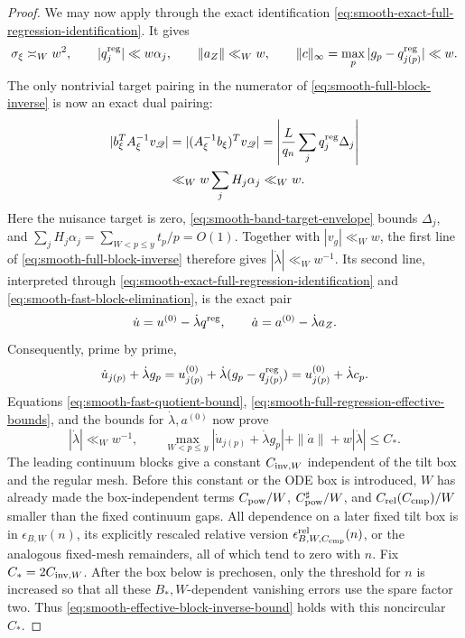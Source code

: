 \documentclass[11pt]{article}
\numberwithin{equation}{section}
\theoremstyle{definition}
\theoremstyle{remark}
\newcommand{\1}{\mathbf 1}
\begin{document}
\begin{proof}
We may now apply  through the exact
identification \eqref{eq:smooth-exact-full-regression-identification}.
It gives
\begin{equation}
 \sigma_\xi\asymp_Ww^2,\qquad
 |q_j^{\rm reg}|\ll w\alpha_j,\qquad
 \|a_Z\|\ll_Ww,\qquad
 \|c\|_\infty=\max_p|g_p-q_{j(p)}^{\rm reg}|\ll w.
 \label{eq:smooth-full-regression-effective-bounds}
\end{equation}
The only nontrivial target pairing in the numerator of
\eqref{eq:smooth-full-block-inverse} is now an exact dual pairing:
\begin{align}
 |b_\xi^TA_\xi^{-1}v_{\mathscr Q}|
 &=|(A_\xi^{-1}b_\xi)^Tv_{\mathscr Q}|
  =\left|\frac L{q_n}\sum_jq_j^{\rm reg}\Delta_j\right|\notag\\
 &\ll_Ww\sum_jH_j\alpha_j\ll_Ww.
 \label{eq:smooth-exact-slow-target-pairing}
\end{align}
Here the nuisance target is zero,
\eqref{eq:smooth-band-target-envelope} bounds \(\Delta_j\), and
\(\sum_jH_j\alpha_j=\sum_{W<p\leq y}t_p/p=O(1)\).
Together with \(|v_g|\ll_Ww\), the first line of
\eqref{eq:smooth-full-block-inverse} therefore gives
\(|\dot\lambda|\ll_Ww^{-1}\).  Its second line, interpreted through
\eqref{eq:smooth-exact-full-regression-identification} and
\eqref{eq:smooth-fast-block-elimination}, is the exact pair
\[
 \dot u=u^{(0)}-\dot\lambda q^{\rm reg},\qquad
 \dot a=a^{(0)}-\dot\lambda a_Z.
\]
Consequently, prime by prime,
\begin{equation}
 \dot u_{j(p)}+\dot\lambda g_p
 =u^{(0)}_{j(p)}+\dot\lambda
       (g_p-q_{j(p)}^{\rm reg})
 =u^{(0)}_{j(p)}+\dot\lambda c_p.
 \label{eq:smooth-exact-effective-prime-coefficient}
\end{equation}
Equations \eqref{eq:smooth-fast-quotient-bound},
\eqref{eq:smooth-full-regression-effective-bounds}, and the bounds for
\(\dot\lambda,a^{(0)}\) now prove
\begin{equation}
 |\dot\lambda|\ll_Ww^{-1},\qquad
 \max_{W<p\le y}|\dot u_{j(p)}+\dot\lambda g_p|
       +\|\dot a\|+w|\dot\lambda|\leq C_*.
 \label{eq:smooth-effective-block-inverse-bound}
\end{equation}
The leading continuum blocks give a constant \(C_{{\rm inv},W}\) independent of
the tilt box and the regular mesh.  Before this constant or the ODE box
is introduced, \(W\) has already made the box-independent terms
\(C_{\rm pow}/W\), \(C_{\rm pow}^{\sharp}/W\), and
\(C_{\rm rel}(C_{\rm cmp})/W\) smaller than the fixed continuum gaps.
All dependence on a later fixed tilt box is in
\(\epsilon_{B,W}(n)\), its explicitly rescaled relative version
\(\epsilon^{\rm rel}_{B,W,C_{\rm cmp}}(n)\), or the analogous fixed-mesh
remainders, all of which tend to zero with \(n\).  Fix
\(C_*=2C_{{\rm inv},W}\).  After the box below is prechosen, only the threshold
for \(n\) is increased so that all these \(B_*,W\)-dependent vanishing
errors use the spare factor two.  Thus
\eqref{eq:smooth-effective-block-inverse-bound} holds with this
noncircular \(C_*\).


\end{proof}
\end{document}
